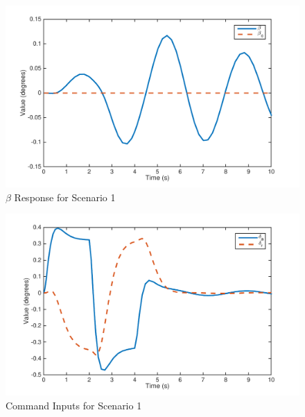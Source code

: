 \documentclass[11pt]{article}
\begin{document}
\begin{figure}[h!]
\begin{center}
\includegraphics[height=.425\textheight]{figures/beta2}
\caption{$\beta$ Response for Scenario 1}
\end{center}
\end{figure}

\begin{figure}[h!]
\begin{center}
\includegraphics[height=.425\textheight]{figures/inputs2}
\caption{Command Inputs for Scenario 1}
\end{center}
\end{figure}
\end{document}
